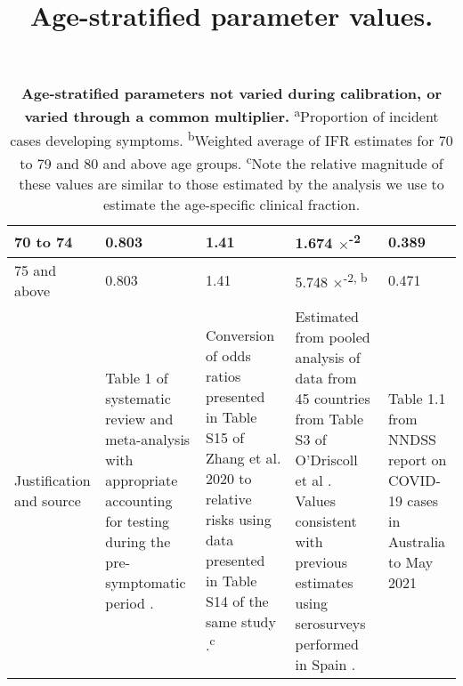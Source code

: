 \begin{table}[ht]
\begin{tabular}[ht]{| p{2cm} | p{2.5cm} | p{3cm} | p{3cm} | p{2.5cm}|}
        \hline
        70 to 74 & 0.803 & 1.41 & 1.674 $\times$\textsuperscript{-2} & 0.389 \\
        \hline
        75 and above & 0.803 & 1.41 & 5.748 $\times$\textsuperscript{-2, b} & 0.471 \\
        \hline
        Justification and source & 
        Table 1 of systematic review and meta-analysis with appropriate accounting for testing during the pre-symptomatic period \cite{sah-2021}. & 
        Conversion of odds ratios presented in Table S15 of Zhang et al. 2020 to relative risks using data presented in Table S14 of the same study \cite{RN7}.\textsuperscript{c} &
        Estimated from pooled analysis of data from 45 countries from Table S3 of O'Driscoll et al \cite{RN6}. Values consistent with previous estimates using serosurveys performed in Spain \cite{RN21}. &
        Table 1.1 from NNDSS report on COVID-19 cases in Australia to May 2021 \\ \hline
	\end{tabular}
	\title{Age-stratified parameter values.}
	\caption{\textbf{Age-stratified parameters not varied during calibration, or varied through a common multiplier.} \textsuperscript{a}Proportion of incident cases developing symptoms. \textsuperscript{b}Weighted average of IFR estimates for 70 to 79 and 80 and above age groups. \textsuperscript{c}Note the relative magnitude of these values are similar to those estimated by the analysis we use to estimate the age-specific clinical fraction.}
	\label{tab:age_params}
\end{table}

\clearpage